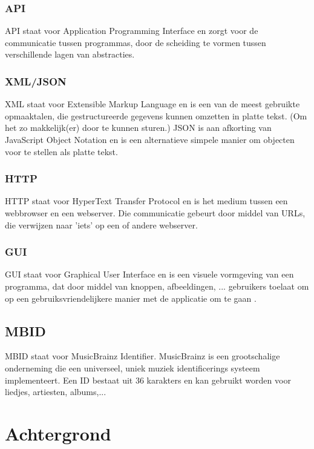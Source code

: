 \documentclass[11pt,a4paper]{article}
\begin{document}
		\subsubsection{API}
		API staat voor Application Programming Interface en zorgt voor de communicatie tussen programmas, door de scheiding te vormen tussen verschillende lagen van abstracties.
		\subsubsection{XML/JSON}
		XML staat voor Extensible Markup Language en is een van de meest gebruikte opmaaktalen, die gestructureerde gegevens kunnen omzetten in platte tekst. (Om het zo makkelijk(er) door te kunnen sturen.)
		\newline
		JSON is aan afkorting van JavaScript Object Notation en is een alternatieve simpele manier om objecten voor te stellen als platte tekst.
		\subsubsection{HTTP}
		HTTP staat voor HyperText Transfer Protocol en is het medium tussen een webbrowser en een webserver. Die communicatie gebeurt door middel van URLs, die verwijzen naar 'iets' op een of andere webserver.
		\subsubsection{GUI}
		GUI staat voor Graphical User Interface en is een visuele vormgeving van een programma, dat door middel van knoppen, afbeeldingen, ... gebruikers toelaat om op een gebruiksvriendelijkere manier met de applicatie om te gaan .
		
		\subsection{MBID}
		MBID staat voor MusicBrainz Identifier. MusicBrainz is een grootschalige onderneming die een universeel, uniek muziek identificerings systeem implementeert. Een ID bestaat uit 36 karakters en kan gebruikt worden voor liedjes, artiesten, albums,...

\section{Achtergrond}
\end{document}
